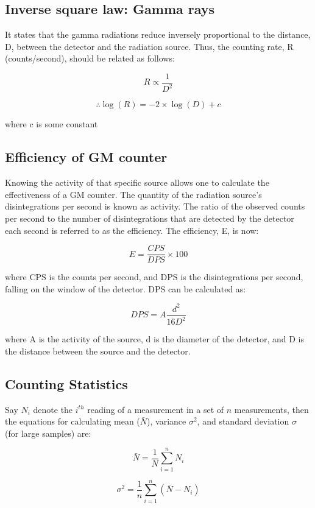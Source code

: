 	\subsection{Inverse square law: Gamma rays}

		It states that the gamma radiations reduce inversely proportional to the distance, D, between the detector and the radiation source. Thus, the counting rate, R (counts/second), should be related as follows:

		$$R \propto \frac{1}{D^2}$$

		$$\therefore\log(R) = -2\times\log(D) + c$$

		where c is some constant

	\subsection{Efficiency of GM counter}

		Knowing the activity of that specific source allows one to calculate the effectiveness of a GM counter. The quantity of the radiation source's disintegrations per second is known as activity. The ratio of the observed counts per second to the number of disintegrations that are detected by the detector each second is referred to as the efficiency. The efficiency, E, is now:

		\begin{equation}
			E = \frac{CPS}{DPS}\times100
			\label{eq:1}
		\end{equation}

		where CPS is the counts per second, and DPS is the disintegrations per second, falling on the window of the detector. DPS can be calculated as:

		\begin{equation}
			DPS = A\frac{d^2}{16D^2}
			\label{eq:2}
		\end{equation}

		where A is the activity of the source, d is the diameter of the detector, and D is the distance between the source and the detector.

	\subsection{Counting Statistics}

		Say $N_i$ denote the $i^{th}$ reading of a measurement in a set of $n$ measurements, then the equations for calculating mean ($\bar{N}$), variance $\sigma^2$, and standard deviation $\sigma$ (for large samples) are:

		$$\bar{N} = \frac{1}{N}\sum_{i = 1}^{n} N_i$$

		$$\sigma^2 = \frac{1}{n} \sum_{i = 1}^{n} (\bar{N} - N_i)$$


